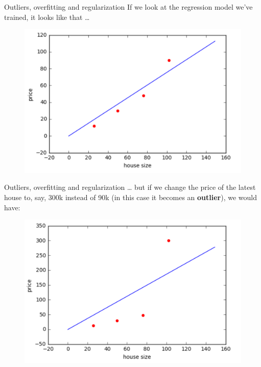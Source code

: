 \documentclass{beamer}
\newcommand{\1}[1]{\mathbbm{1}\left[#1\right]}
\begin{document}
\begin{frame}{Outliers, overfitting and regularization}
If we look at the regression model we've trained, it looks like that \ldots
\begin{figure}
\centering
\includegraphics[width=\linewidth]{images/line_regression.png}
\end{figure}
\end{frame}

\begin{frame}{Outliers, overfitting and regularization}
\ldots{} but if we change the price of the latest house to, say, 300k instead of 90k (in this case it becomes an \textbf{outlier}), we would have:
\begin{figure}
\centering
\includegraphics[width=\linewidth]{images/line_regression_outlier.png}
\end{figure}
\end{frame}
\end{document}
